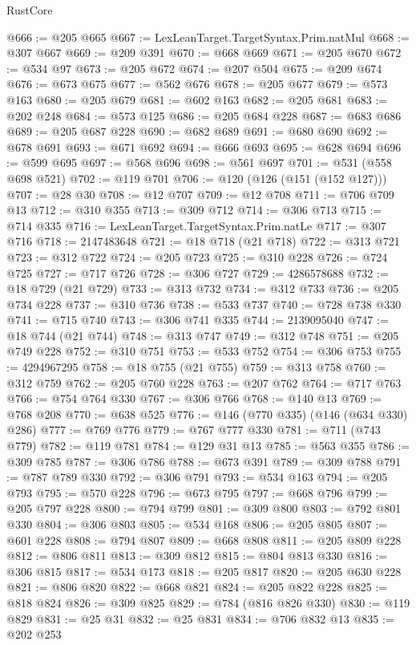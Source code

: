 \begin{lexlean}{RustCore}
\begin{coremodule}
@666 := @205 @665
@667 := LexLeanTarget.TargetSyntax.Prim.natMul
@668 := @307 @667
@669 := @209 @391
@670 := @668 @669
@671 := @205 @670
@672 := @534 @97
@673 := @205 @672
@674 := @207 @504
@675 := @209 @674
@676 := @673 @675
@677 := @562 @676
@678 := @205 @677
@679 := @573 @163
@680 := @205 @679
@681 := @602 @163
@682 := @205 @681
@683 := @202 @248
@684 := @573 @125
@686 := @205 @684 @228
@687 := @683 @686
@689 := @205 @687 @228
@690 := @682 @689
@691 := @680 @690
@692 := @678 @691
@693 := @671 @692
@694 := @666 @693
@695 := @628 @694
@696 := @599 @695
@697 := @568 @696
@698 := @561 @697
@701 := @531 (@558 @698 @521)
@702 := @119 @701
@706 := @120 (@126 (@151 (@152 @127)))
@707 := @28 @30
@708 := @12 @707
@709 := @12 @708
@711 := @706 @709 @13
@712 := @310 @355
@713 := @309 @712
@714 := @306 @713
@715 := @714 @335
@716 := LexLeanTarget.TargetSyntax.Prim.natLe
@717 := @307 @716
@718 := 2147483648
@721 := @18 @718 (@21 @718)
@722 := @313 @721
@723 := @312 @722
@724 := @205 @723
@725 := @310 @228
@726 := @724 @725
@727 := @717 @726
@728 := @306 @727
@729 := 4286578688
@732 := @18 @729 (@21 @729)
@733 := @313 @732
@734 := @312 @733
@736 := @205 @734 @228
@737 := @310 @736
@738 := @533 @737
@740 := @728 @738 @330
@741 := @715 @740
@743 := @306 @741 @335
@744 := 2139095040
@747 := @18 @744 (@21 @744)
@748 := @313 @747
@749 := @312 @748
@751 := @205 @749 @228
@752 := @310 @751
@753 := @533 @752
@754 := @306 @753
@755 := 4294967295
@758 := @18 @755 (@21 @755)
@759 := @313 @758
@760 := @312 @759
@762 := @205 @760 @228
@763 := @207 @762
@764 := @717 @763
@766 := @754 @764 @330
@767 := @306 @766
@768 := @140 @13
@769 := @768 @208
@770 := @638 @525
@776 := @146 (@770 @335) (@146 (@634 @330) @286)
@777 := @769 @776
@779 := @767 @777 @330
@781 := @711 (@743 @779)
@782 := @119 @781
@784 := @129 @31 @13
@785 := @563 @355
@786 := @309 @785
@787 := @306 @786
@788 := @673 @391
@789 := @309 @788
@791 := @787 @789 @330
@792 := @306 @791
@793 := @534 @163
@794 := @205 @793
@795 := @570 @228
@796 := @673 @795
@797 := @668 @796
@799 := @205 @797 @228
@800 := @794 @799
@801 := @309 @800
@803 := @792 @801 @330
@804 := @306 @803
@805 := @534 @168
@806 := @205 @805
@807 := @601 @228
@808 := @794 @807
@809 := @668 @808
@811 := @205 @809 @228
@812 := @806 @811
@813 := @309 @812
@815 := @804 @813 @330
@816 := @306 @815
@817 := @534 @173
@818 := @205 @817
@820 := @205 @630 @228
@821 := @806 @820
@822 := @668 @821
@824 := @205 @822 @228
@825 := @818 @824
@826 := @309 @825
@829 := @784 (@816 @826 @330)
@830 := @119 @829
@831 := @25 @31
@832 := @25 @831
@834 := @706 @832 @13
@835 := @202 @253

\end{coremodule}
\end{lexlean}
